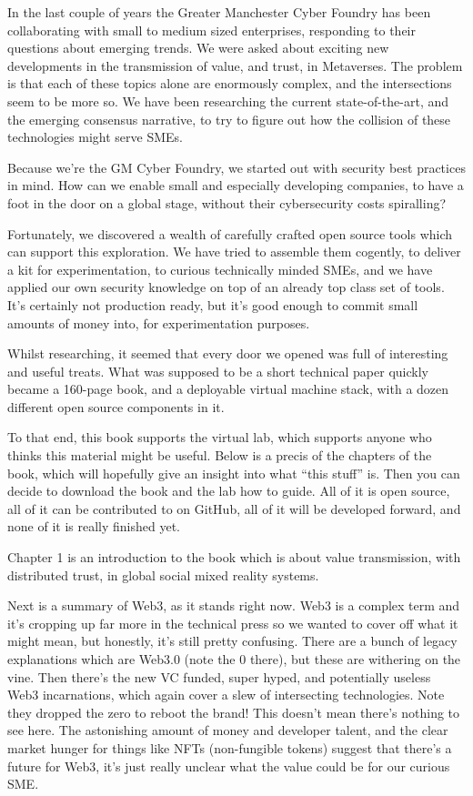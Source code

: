 
In the last couple of years the Greater Manchester Cyber Foundry has been collaborating with small to medium sized enterprises, responding to their questions about emerging trends. We were asked about exciting new developments in the transmission of value, and trust, in Metaverses. The problem is that each of these topics alone are enormously complex, and the intersections seem to be more so. We have been researching the current state-of-the-art, and the emerging consensus narrative, to try to figure out how the collision of these technologies might serve SMEs. \par
Because we’re the GM Cyber Foundry, we started out with security best practices in mind. How can we enable small and especially developing companies, to have a foot in the door on a global stage, without their cybersecurity costs spiralling? \par
Fortunately, we discovered a wealth of carefully crafted open source tools which can support this exploration. We have tried to assemble them cogently, to deliver a kit for experimentation, to curious technically minded SMEs, and we have applied our own security knowledge on top of an already top class set of tools. It’s certainly not production ready, but it's good enough to commit small amounts of money into, for experimentation purposes.\par
Whilst researching, it seemed that every door we opened was full of interesting and useful treats. What was supposed to be a short technical paper quickly became a 160-page book, and a deployable virtual machine stack, with a dozen different open source components in it. \par
To that end, this book supports the virtual lab, which supports anyone who thinks this material might be useful. Below is a precis of the chapters of the book, which will hopefully give an insight into what ``this stuff'' is. Then you can decide to download the book and the lab how to guide. All of it is open source, all of it can be contributed to on GitHub, all of it will be developed forward, and none of it is really finished yet.\par
Chapter 1  is an introduction to the book which is about value transmission, with distributed trust, in global social mixed reality systems. \par
Next is a summary of Web3, as it stands right now. Web3 is a complex term and it’s cropping up far more in the technical press so we wanted to cover off what it might mean, but honestly, it’s still pretty confusing. There are a bunch of legacy explanations which are Web3.0 (note the 0 there), but these are withering on the vine. Then there’s the new VC funded, super hyped, and potentially useless Web3 incarnations, which again cover a slew of intersecting technologies. Note they dropped the zero to reboot the brand! This doesn’t mean there’s nothing to see here. The astonishing amount of money and developer talent, and the clear market hunger for things like NFTs (non-fungible tokens) suggest that there’s a future for Web3, it’s just really unclear what the value could be for our curious SME.\par
